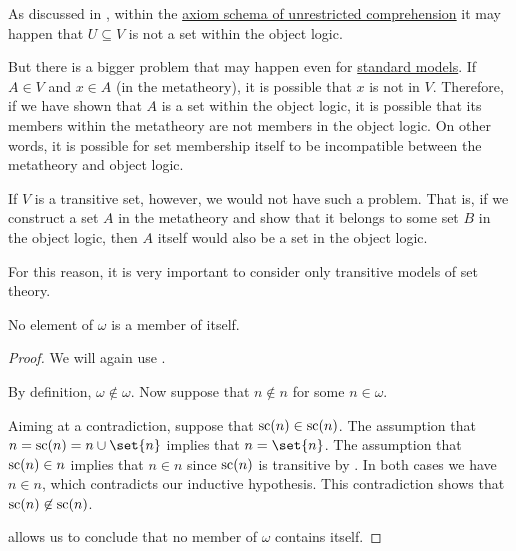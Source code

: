 \begin{remark}\label{rem:transitive_model_of_set_theory}
  As discussed in , within the \hyperref[def:naive_set_theory/unrestricted_comprehension]{axiom schema of unrestricted comprehension} it may happen that \( U \subseteq V \) is not a set within the object logic.

  But there is a bigger problem that may happen even for \hyperref[rem:standard_model_of_set_theory]{standard models}. If \( A \in V \) and \( x \in A \) (in the metatheory), it is possible that \( x \) is not in \( V \). Therefore, if we have shown that \( A \) is a set within the object logic, it is possible that its members within the metatheory are not members in the object logic. On other words, it is possible for set membership itself to be incompatible between the metatheory and object logic.

  If \( V \) is a transitive set, however, we would not have such a problem. That is, if we construct a set \( A \) in the metatheory and show that it belongs to some set \( B \) in the object logic, then \( A \) itself would also be a set in the object logic.

  For this reason, it is very important to consider only transitive models of set theory.
\end{remark}

\begin{lemma}\label{thm:members_of_omega_do_not_contain_themselves}
  No element of \( \omega \) is a member of itself.
\end{lemma}
\begin{proof}
  We will again use .

  By definition, \( \omega \not\in \omega \). Now suppose that \( n \not\in n \) for some \( n \in \omega \).

  Aiming at a contradiction, suppose that \( \op{sc}(n) \in \op{sc}(n) \). The assumption that \( n = \op{sc}(n) = n \cup \set{ n } \) implies that \( n = \set{ n } \). The assumption that \( \op{sc}(n) \in n \) implies that \( n \in n \) since \( \op{sc}(n) \) is transitive by . In both cases we have \( n \in n \), which contradicts our inductive hypothesis. This contradiction shows that \( \op{sc}(n) \not\in \op{sc}(n) \).

   allows us to conclude that no member of \( \omega \) contains itself.
\end{proof}

